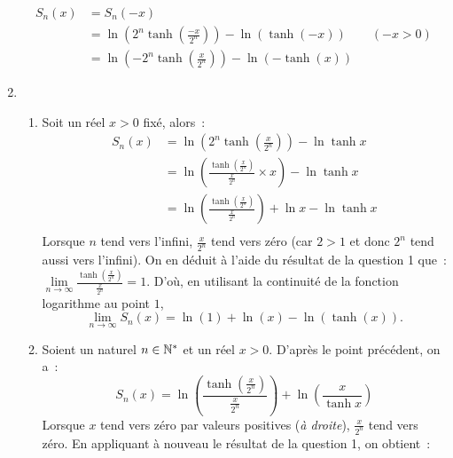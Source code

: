 \begin{corrige}
\begin{enumerate}
            \begin{align*}
                S_n(x)  &= S_n(-x) \\
                        &= \ln\left(2^n\tanh\left(\frac{-x}{2^n}\right)\right) - \ln(\tanh(-x)) \qquad (-x>0)\\
                        &= \ln\left(-2^n\tanh\left(\frac{x}{2^n}\right)\right) - \ln(-\tanh(x))
            \end{align*}
        \item 
            \begin{enumerate}
                \item Soit un réel \(x>0\) fixé, alors~:
                    \begin{align*}
                        S_n(x)  &= \ln\left(2^n\tanh\left(\frac{x}{2^n}\right)\right) - \ln\tanh x\\
                        &= \ln\left(\frac{\tanh\left(\frac{x}{2^n}\right)}{\frac{x}{2^n}} \times x \right) - \ln\tanh x\\
                        &= \ln\left(\frac{\tanh\left(\frac{x}{2^n}\right)}{\frac{x}{2^n}} \right) + \ln x - \ln\tanh x\\
                    \end{align*}
                        Lorsque \(n\) tend vers l'infini, \(\frac{x}{2^n}\) tend vers zéro (car \(2>1\) et donc \(2^n\) tend aussi vers l'infini). On en déduit à l'aide du résultat de la question 1 que~: \(\lim\limits_{n\to \infty} \frac{\tanh\left(\frac{x}{2^n}\right)}{\frac{x}{2^n}} = 1\). D'où, en utilisant la continuité de la fonction logarithme au point \(1\),
                    \begin{equation*}
                        \lim\limits_{n\to\infty} S_n(x) = \ln(1) + \ln(x) - \ln(\tanh(x)).
                    \end{equation*}
                \item Soient un naturel \(n \in \mathbb{N}^*\) et un réel \(x>0\). D'après le point précédent, on a~:
                    \begin{equation*}
                        S_n(x)= \ln\left(\frac{\tanh\left(\frac{x}{2^n}\right)}{\frac{x}{2^n}} \right) + \ln\left(\frac{x}{\tanh x}\right)
                    \end{equation*}
                    Lorsque \(x\) tend vers zéro par valeurs positives (\emph{à droite}), \(\frac{x}{2^n}\) tend vers zéro. En appliquant à nouveau le résultat de la question 1, on obtient~:
                    \begin{equation*}

\end{equation*}
\end{enumerate}
\end{enumerate}
\end{corrige}
